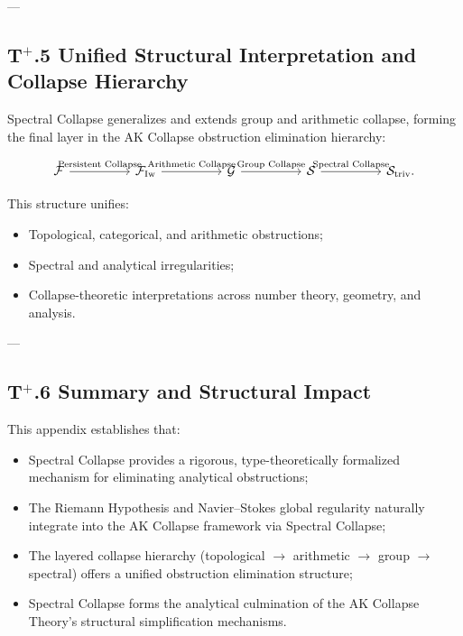 \documentclass[11pt]{article}
\begin{document}
---

\subsection*{T$^{+}$.5 Unified Structural Interpretation and Collapse Hierarchy}

Spectral Collapse generalizes and extends group and arithmetic collapse, forming the final layer in the AK Collapse obstruction elimination hierarchy:

\[
\begin{tikzcd}[column sep=huge]
\mathcal{F} \arrow[r, "\text{Persistent Collapse}"]
& \mathcal{F}_{\mathrm{Iw}} \arrow[r, "\text{Arithmetic Collapse}"]
& \mathcal{G} \arrow[r, "\text{Group Collapse}"]
& \mathcal{S} \arrow[r, "\text{Spectral Collapse}"]
& \mathcal{S}_{\mathrm{triv}}.
\end{tikzcd}
\]

This structure unifies:
\begin{itemize}
    \item Topological, categorical, and arithmetic obstructions;
    \item Spectral and analytical irregularities;
    \item Collapse-theoretic interpretations across number theory, geometry, and analysis.
\end{itemize}

---

\subsection*{T$^{+}$.6 Summary and Structural Impact}

This appendix establishes that:
\begin{itemize}
    \item Spectral Collapse provides a rigorous, type-theoretically formalized mechanism for eliminating analytical obstructions;
    \item The Riemann Hypothesis and Navier--Stokes global regularity naturally integrate into the AK Collapse framework via Spectral Collapse;
    \item The layered collapse hierarchy (topological $\to$ arithmetic $\to$ group $\to$ spectral) offers a unified obstruction elimination structure;
    \item Spectral Collapse forms the analytical culmination of the AK Collapse Theory's structural simplification mechanisms.
\end{itemize}
\end{document}
